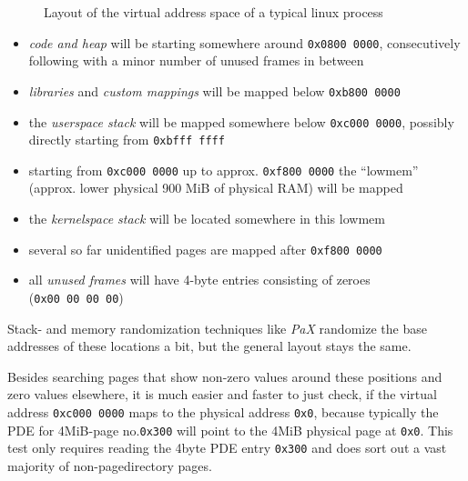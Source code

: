 \begin{figure}[ht] \begin{center}

	\epsfysize 9.5cm


        \caption{Layout of the virtual address space of a typical linux process}

	\label{fig:linux_virtual_address_space}

\end{center}\end{figure}


\begin{itemize}

	\item \emph{code and heap} will be starting somewhere around
	\texttt{0x0800~0000}, consecutively following with a minor number of
	unused frames in between

	\item \emph{libraries} and \emph{custom mappings} will be mapped below
	\texttt{0xb800~0000}

	\item the \emph{userspace stack} will be mapped somewhere below
	\texttt{0xc000~0000}, possibly directly starting from
	\texttt{0xbfff~ffff}

	\item starting from \texttt{0xc000~0000} up to approx.
	\texttt{0xf800~0000} the ``lowmem'' (approx. lower physical 900 MiB of
	physical RAM) will be mapped

	\item the \emph{kernelspace stack} will be located somewhere in this
	lowmem

	\item several so far unidentified pages are mapped after
	\texttt{0xf800~0000}

	\item all \emph{unused frames} will have 4-byte entries consisting of
	zeroes (\texttt{0x00~00~00~00})

\end{itemize}

Stack- and memory randomization techniques like \emph{PaX} randomize the base
addresses of these locations a bit, but the general layout stays the same.

Besides searching pages that show non-zero values around these positions and
zero values elsewhere, it is much easier and faster to just check, if the
virtual address \texttt{0xc000~0000} maps to the physical address \texttt{0x0},
because typically the PDE for 4MiB-page no.\@ \texttt{0x300} will point to the
4MiB physical page at \texttt{0x0}. This test only requires reading the 4byte
PDE entry \texttt{0x300} and does sort out a vast majority of non-pagedirectory
pages.

